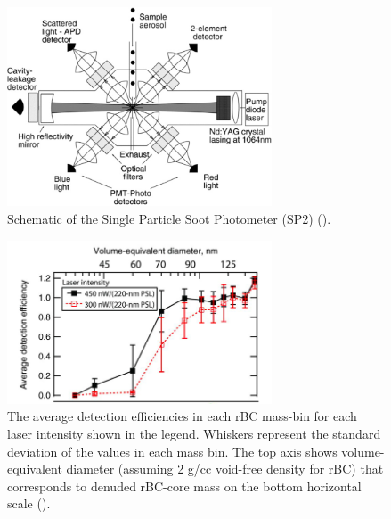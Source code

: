 \documentclass[12pt, fullpage]{uiucthesis2009}
\begin{document}
	\begin{figure}[h] 
		\begin{center}
			\includegraphics[width = 0.7\textwidth]{Figure09}
			\caption[Schematic of the Single Particle Soot Photometer (SP2) (\cite{schwarz2010global}).]{\label{fig_P9} Schematic of the Single Particle Soot Photometer (SP2) (\cite{schwarz2010global}).}
		\end{center}
	\end{figure}
	
	\begin{figure}[h] 
		\begin{center}
			\includegraphics[width = 0.7\textwidth]{Figure08}
			\caption[The average detection efficiencies in each rBC mass-bin for each laser intensity shown in the legend. Whiskers represent the standard deviation of the values in each mass bin. The top axis shows volume-equivalent diameter (assuming 2 g/cc void-free density for rBC) that corresponds to denuded rBC-core mass on the bottom horizontal scale (\cite{schwarz2010global})]{\label{fig_P8} The average detection efficiencies in each rBC mass-bin for each laser intensity shown in the legend. Whiskers represent the standard deviation of the values in each mass bin. The top axis shows volume-equivalent diameter (assuming 2 g/cc void-free density for rBC) that corresponds to denuded rBC-core mass on the bottom horizontal scale (\cite{schwarz2010global}).}
		\end{center}
	\end{figure}
\end{document}
